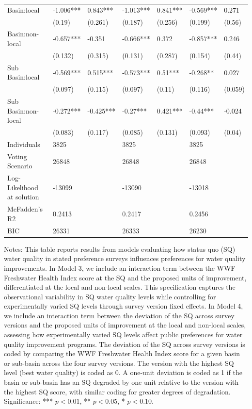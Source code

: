 {\begin{table}[H]
{\begin{tabular}{lllllll}
  Basin:local & -1.006*** & 0.843*** & -1.013*** & 0.841*** & -0.569*** & 0.271 \\ 
   & (0.19) & (0.261) & (0.187) & (0.256) & (0.199) & (0.56) \\ 
  Basin:non-local & -0.657*** & -0.351 & -0.666*** & 0.372 & -0.857*** & 0.246 \\ 
   & (0.132) & (0.315) & (0.131) & (0.287) & (0.154) & (0.44) \\ 
  Sub Basin:local & -0.569*** & 0.515*** & -0.573*** & 0.51*** & -0.268** & 0.027 \\ 
   & (0.097) & (0.115) & (0.097) & (0.11) & (0.116) & (0.059) \\ 
  Sub Basin:non-local & -0.272*** & -0.425*** & -0.27*** & 0.421*** & -0.44*** & -0.024 \\ 
   & (0.083) & (0.117) & (0.085) & (0.131) & (0.093) & (0.04) \\ 
\midrule
  Individuals & 3825 &  & 3825 &  & 3825 &  \\ 
  Voting Scenario & 26848 &  & 26848 &  & 26848 &  \\ 
  Log-Likelihood at solution & -13099 &  & -13090 &  & -13018 &  \\ 
  McFadden’s R2 & 0.2413 &  & 0.2417 &  & 0.2456 &  \\ 
  BIC & 26331 &  & 26333 &  & 26230 &  \\ 
   \midrule

\end{tabular}
}
\begin{minipage}{17cm}  
\singlespacing  
\vspace{0.01cm}  
\footnotesize Notes: This table reports results from models evaluating how status quo (SQ) water quality in stated preference 
surveys influences preferences for water quality improvements. In Model 3, we include an interaction term between the WWF 
Freshwater Health Index score at the SQ and the proposed units of improvement, differentiated at the local and non-local scales. 
This specification captures the observational variability in SQ water quality levels while controlling for experimentally varied 
SQ levels through survey version fixed effects. In Model 4, we include an interaction term between the deviation of the SQ across 
survey versions and the proposed units of improvement at the local and non-local scales, assessing how experimentally varied SQ 
levels affect public preferences for water quality improvement programs. The deviation of the SQ across survey versions is coded 
by comparing the WWF Freshwater Health Index score for a given basin or sub-basin across the four survey versions. The version 
with the highest SQ level (best water quality) is coded as 0. A one-unit deviation is coded as 1 if the basin or sub-basin has 
an SQ degraded by one unit relative to the version with the highest SQ score, with similar coding for greater degrees of degradation.
Significance: *** $p < 0.01$, ** $p < 0.05$, * $p < 0.10$. 
\end{minipage}
\end{table}
}

